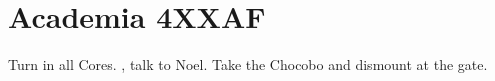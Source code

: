 \chapter{Academia 4XXAF}

Turn in all Cores. , talk to Noel.  Take the Chocobo and dismount at the gate. \livet{\tri}
\newline